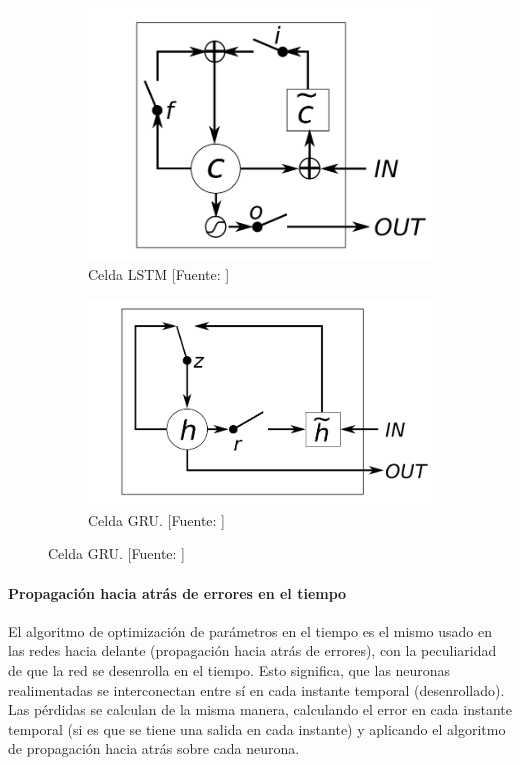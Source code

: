 \begin{figure}
	\begin{subfigure}[b]{0.5\textwidth}
		\centering
		\includegraphics[width=\linewidth]{imagenes/metodos/lstm.png}
		\caption{Celda LSTM [Fuente: \cite{chung2014empirical}]}
		\label{fig:metodos/lstm}
	\end{subfigure}
	\begin{subfigure}[b]{0.5\textwidth}
		\centering
		\includegraphics[width=\linewidth]{imagenes/metodos/gru.png}
		\caption{Celda GRU. [Fuente: \cite{chung2014empirical}]}
		\label{fig:metodos/gru}
	\end{subfigure}
\end{figure}
\paragraph{Propagación hacia atrás de errores en el tiempo}
El algoritmo de optimización de parámetros en el tiempo es el mismo usado en las redes hacia delante (propagación hacia atrás de errores), con la peculiaridad de que la red se desenrolla en el tiempo. Esto significa, que las neuronas realimentadas se interconectan entre sí en cada instante temporal (desenrollado). Las pérdidas se calculan de la misma manera, calculando el error en cada instante temporal (si es que se tiene una salida en cada instante) y aplicando el algoritmo de propagación hacia atrás sobre cada neurona.

